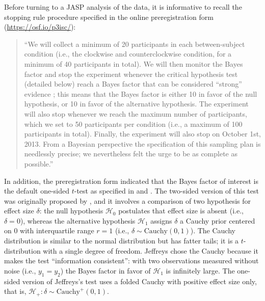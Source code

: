 Before turning to a JASP analysis of the data, it is informative to recall the stopping rule procedure specified in the online preregistration form (\url{https://osf.io/p3isc/}):
\begin{quotation}
``We will collect a minimum of 20 participants in each between-subject condition (i.e., the clockwise and counterclockwise condition, for a minimum of 40 participants in total). We will then monitor the Bayes factor and stop the experiment whenever the critical hypothesis test (detailed below) reach a Bayes factor that can be considered ``strong'' evidence \cite{Jeffreys1961}; this means that the Bayes factor is either 10 in favor of the null hypothesis, or 10 in favor of the alternative hypothesis. The experiment will also stop whenever we reach the maximum number of participants, which we set to 50 participants per condition (i.e., a maximum of 100 participants in total). Finally, the experiment will also stop on October 1st, 2013. From a Bayesian perspective the specification of this sampling plan is needlessly precise; we nevertheless felt the urge to be as complete as possible.''
\end{quotation}

In addition, the preregistration form indicated that the Bayes factor of interest is the default one-sided $t$-test as specified in  and . The two-sided version of this test was originally proposed by , and it involves a comparison of two hypothesis for effect size $\delta$: the null hypothesis $\mathcal{H}_0$ postulates that effect size is absent (i.e., $\delta = 0$), whereas the alternative hypothesis $\mathcal{H}_1$ assigns $\delta$ a Cauchy prior centered on 0 with interquartile range $r=1$ (i.e., $\delta \sim \text{Cauchy}(0,1)$). The Cauchy distribution is similar to the normal distribution but has fatter tails; it is a $t$-distribution with a single degree of freedom. Jeffreys chose the Cauchy because it makes the test ``information consistent'': with two observations measured without noise (i.e., $y_1 = y_2$) the Bayes factor in favor of $\mathcal{H}_1$ is infinitely large. The one-sided version of Jeffreys's test uses a folded Cauchy with positive effect size only, that is, $\mathcal{H}_+: \delta \sim \text{Cauchy}^+(0,1)$.

